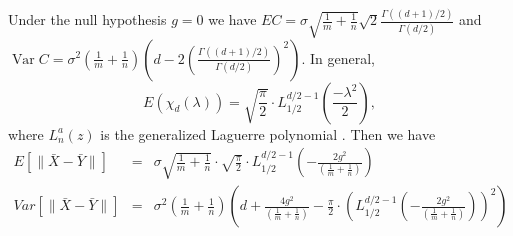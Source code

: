 \documentclass[12pt]{article}
\begin{document}
{Under the null hypothesis $g=0$ we have $EC=\sigma \sqrt{\frac{1}{m}+\frac{1}{n}}\sqrt{2}\frac{\Gamma((d+1)/2)}{\Gamma(d/2)}$ and $\operatorname{Var} C=\sigma^2(\frac{1}{m}+\frac{1}{n})(d-2(\frac{\Gamma((d+1)/2)}{\Gamma(d/2)})^2)$.
In general, 
\[
E(\chi_d(\lambda))
=\sqrt{\frac{\pi}{2}}\cdot L_{1/2}^{d/2-1}(\frac{-\lambda^2}{2}),
\]
where $ L_{n}^{a}(z)$ is the generalized Laguerre polynomial \citep{koekoek1993generalization}. Then we have
\begin{eqnarray}
\label{A}
E[\|\bar X-\bar Y\|]&=&\sigma \sqrt{\frac{1}{m}+\frac{1}{n}}\cdot\sqrt{\frac{\pi}{2}}\cdot L_{1/2}^{d/2-1}(-\frac{2g^2}{ (\frac{1}{m}+\frac{1}{n})})\\
Var[\|\bar X-\bar Y\|]&=&\sigma^2(\frac{1}{m}+\frac{1}{n})(d+\frac{4g^2}{ (\frac{1}{m}+\frac{1}{n})}-\frac{\pi}{2}\cdot( L_{1/2}^{d/2-1}(-\frac{2g^2}{ (\frac{1}{m}+\frac{1}{n})}))^2)
\end{eqnarray}
}
\end{document}
